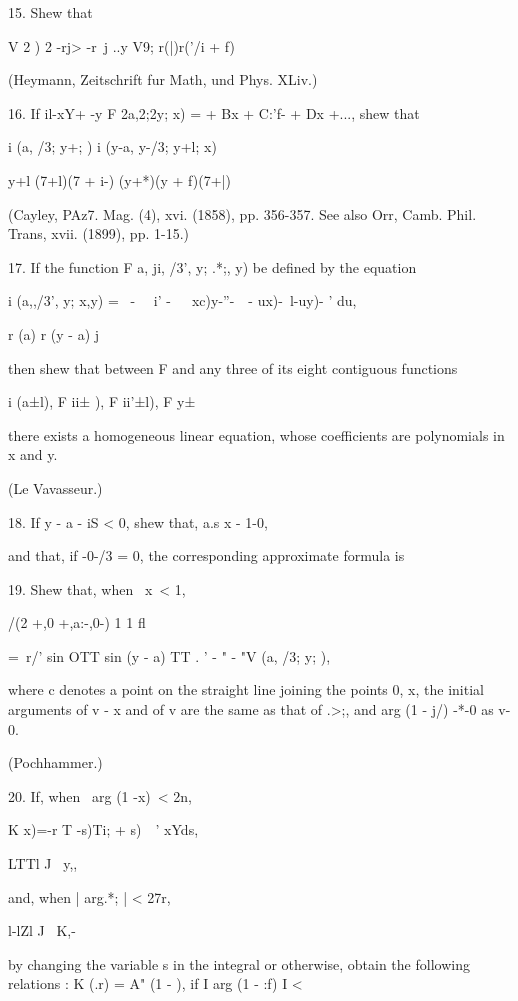15. Shew that

V 2 ) 2 -rj> -r\ j ..y V9; r(|)r('/i + f)

(Heymann, Zeitschrift fur Math, und Phys. XLiv.)

16. If il-xY+ -y F 2a,2;2y; x) = + Bx + C:'f- + Dx +..., shew that

i (a, /3; y+; ) i (y-a, y-/3; y+l; x)

y+l (7+l)(7 + i-) (y+*)(y + f)(7+|)

(Cayley, PAz7. Mag. (4), xvi. (1858), pp. 356-357. See also Orr, Camb.
Phil. Trans, xvii. (1899), pp. 1-15.)

17. If the function F a, ji, /3', y; .*;, y) be defined by the
equation

i (a,,/3', y; x,y) = \ - \ \ i' -\ \ ~xc)y-''-\ \ - ux)-\ l-uy)- '
du,

r (a) r (y - a) j

then shew that between F and any three of its eight contiguous
functions

i (a±l), F ii± ), F ii'±l), F y±\ \

there exists a homogeneous linear equation, whose coefficients are
polynomials in x and y.

(Le Vavasseur.)

%
%

18. If y - a - iS < 0, shew that, a.s x - 1-0,

and that, if -0-/3 = 0, the corresponding approximate formula is


19. Shew that, when \ x\ < 1,

/(2 +,0 +,a:-,0-) 1 1 fl

= \,r/' sin OTT sin (y - a) TT . ' - " - "V (a, /3; y; ),

where c denotes a point on the straight line joining the points 0, x,
the initial arguments of v - x and of v are the same as that of .>;,
and arg (1 - j/) -*-0 as v- 0.

(Pochhammer.)

20. If, when \ arg (1 -x)\ < 2n,

K x)=-r T -s)Ti; + s)\ \ ' xYds,

LTTl J \ y,,

and, when | arg.*; | < 27r,

l-lZl J \ K,-

by changing the variable s in the integral or otherwise, obtain the
following relations : K (.r) = A" (1 - ), if I arg (1 - :f) I <


